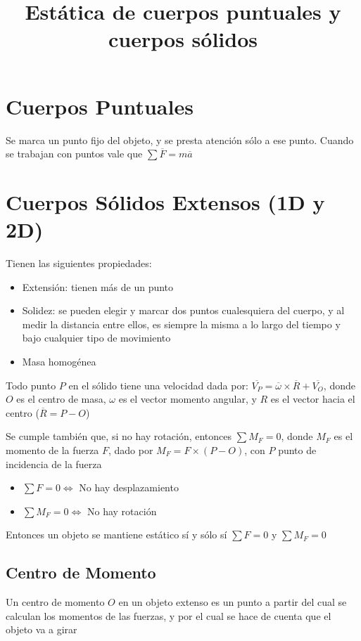 \documentclass{article}
\title{Estática de cuerpos puntuales y cuerpos sólidos}
\date{}
\begin{document}
\maketitle
\section{Cuerpos Puntuales}
Se marca un punto fijo del objeto, y se presta atención sólo a ese punto.
Cuando se trabajan con puntos vale que $\sum \overline{F} = m\overline{a}$

\section{Cuerpos Sólidos Extensos (1D y 2D)}
Tienen las siguientes propiedades:
\begin{itemize}
	\item Extensión: tienen más de un punto
	\item Solidez: se pueden elegir y marcar dos puntos cualesquiera del
		cuerpo, y al medir la distancia entre ellos, es siempre la misma
		a lo largo del tiempo y bajo cualquier tipo de movimiento
	\item Masa homogénea
\end{itemize}

Todo punto $P$ en el sólido tiene una velocidad dada por:
$\overline{V_P} = \overline{\omega} \times \overline{R} + \overline{V_O}$,
donde $O$ es el centro de masa, $\omega$ es el vector momento angular, y $R$
es el vector hacia el centro ($\overline{R} = P - O$)

Se cumple también que, si no hay rotación, entonces $\sum M_F = 0$, donde
$M_F$ es el momento de la fuerza $F$, dado por $M_F = F \times (P - O)$, con
$P$ punto de incidencia de la fuerza

\begin{itemize}
	\item $\sum F = 0 \iff $ No hay desplazamiento
	\item $\sum M_F = 0 \iff $ No hay rotación
\end{itemize}

Entonces un objeto se mantiene estático sí y sólo sí $\sum F = 0$ y
$\sum M_F = 0$

\subsection{Centro de Momento}
Un centro de momento $O$ en un objeto extenso es un punto a partir del cual
se calculan los momentos de las fuerzas, y por el cual se hace de cuenta que
el objeto va a girar
\end{document}

